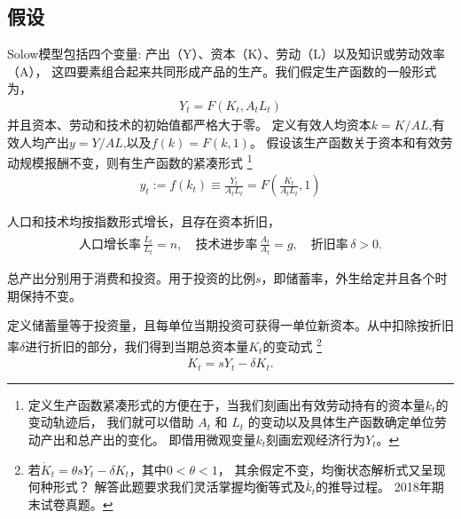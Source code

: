 \documentclass[cn,normal,11pt,black]{elegantnote}
\begin{document}
\subsection{假设}

\begin{definition}[生产函数]
    Solow模型包括四个变量: 产出（Y）、资本（K）、劳动（L）以及知识或劳动效率（A），
    这四要素组合起来共同形成产品的生产。我们假定生产函数的一般形式为，
    \begin{align}
        Y_t = F(K_t, A_t L_t)
    \end{align}
    并且资本、劳动和技术的初始值都严格大于零。
    定义有效人均资本$k=K/AL$,有效人均产出$y=Y/AL$,以及$f(k)=F(k,1)$。
    假设该生产函数关于资本和有效劳动规模报酬不变，则有生产函数的紧凑形式
    \footnote{定义生产函数紧凑形式的方便在于，当我们刻画出有效劳动持有的资本量$k_t$的变动轨迹后，
        我们就可以借助 $A_t$ 和 $L_t$ 的变动以及具体生产函数确定单位劳动产出和总产出的变化。
        即借用微观变量$k_t$刻画宏观经济行为$Y_t$。}
    \begin{align}
        y_t := f(k_t) \equiv \frac{Y_t}{A_t L_t} = F(\frac{K_t}{A_t L_t},1) 
    \end{align}
\end{definition} 

\begin{definition}[投入要素]
    人口和技术均按指数形式增长，且存在资本折旧，
\begin{align}
    \mbox{人口增长率} \, \frac{\dot{L_t}}{L_t} = n, \quad
    \mbox{技术进步率} \, \frac{\dot{A}_t}{A_t} = g, \quad
    \mbox{折旧率} \, \delta > 0 .
\end{align}
\end{definition}

\begin{definition}[储蓄率]
    总产出分别用于消费和投资。用于投资的比例$s$，即储蓄率，外生给定并且各个时期保持不变。
\end{definition}

\begin{definition}[资本动态方程]
    定义储蓄量等于投资量，且每单位当期投资可获得一单位新资本。从中扣除按折旧率$\delta$进行折旧的部分，我们得到当期总资本量$K_t$的变动式
    \footnote{若$\dot{K}_t = \theta s Y_t-\delta K_t$，其中$0<\theta <1$，
        其余假定不变，均衡状态解析式又呈现何种形式？
        解答此题要求我们灵活掌握均衡等式及$\dot{k_t}$的推导过程。
        2018年期末试卷真题。}
\begin{equation}
    \dot{K}_t = s Y_t-\delta K_t .
\end{equation}
\end{definition}
\end{document}
